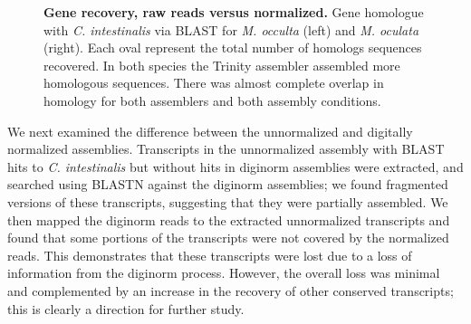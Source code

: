 \begin{figure}[!ht]
	\hfill
	\caption{\textbf{Gene recovery, raw reads versus normalized.} Gene homologue with \textit{C. intestinalis} via BLAST for \textit{M. occulta} (left) and \textit{M. oculata} (right). Each oval represent the total number of homologs sequences recovered. In both species the Trinity assembler assembled more homologous sequences. There was almost complete overlap in homology for both assemblers and both assembly conditions.}
	\label{fig:overlap}
\end{figure}
     
We next examined the difference between the unnormalized and digitally normalized assemblies. Transcripts in the unnormalized assembly with BLAST hits to \textit{C. intestinalis} but without hits in diginorm assemblies were extracted, and searched using BLASTN against the diginorm assemblies; we found fragmented versions of these transcripts, suggesting that they were partially assembled.  We then mapped the diginorm reads to the extracted unnormalized transcripts and found that some portions of the transcripts were not covered by the normalized reads. This demonstrates that these transcripts were lost due to a loss of information from the diginorm process.  However, the overall loss was minimal and complemented by an increase in the recovery of other conserved transcripts; this is clearly a direction for further study.
